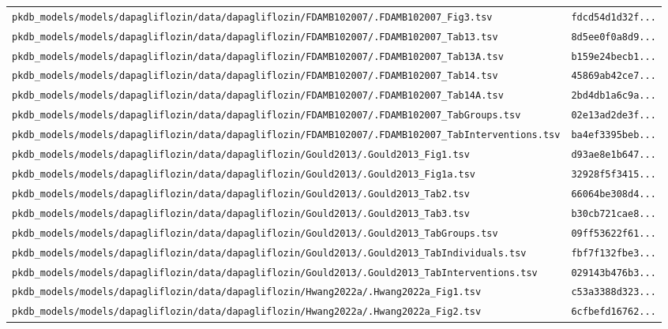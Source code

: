 \documentclass{article}
\begin{document}
\begin{longtable}{ll}
\texttt{pkdb\_models/models/dapagliflozin/data/dapagliflozin/FDAMB102007/.FDAMB102007\_Fig3.tsv} & \texttt{fdcd54d1d32f...} \\
\texttt{pkdb\_models/models/dapagliflozin/data/dapagliflozin/FDAMB102007/.FDAMB102007\_Tab13.tsv} & \texttt{8d5ee0f0a8d9...} \\
\texttt{pkdb\_models/models/dapagliflozin/data/dapagliflozin/FDAMB102007/.FDAMB102007\_Tab13A.tsv} & \texttt{b159e24becb1...} \\
\texttt{pkdb\_models/models/dapagliflozin/data/dapagliflozin/FDAMB102007/.FDAMB102007\_Tab14.tsv} & \texttt{45869ab42ce7...} \\
\texttt{pkdb\_models/models/dapagliflozin/data/dapagliflozin/FDAMB102007/.FDAMB102007\_Tab14A.tsv} & \texttt{2bd4db1a6c9a...} \\
\texttt{pkdb\_models/models/dapagliflozin/data/dapagliflozin/FDAMB102007/.FDAMB102007\_TabGroups.tsv} & \texttt{02e13ad2de3f...} \\
\texttt{pkdb\_models/models/dapagliflozin/data/dapagliflozin/FDAMB102007/.FDAMB102007\_TabInterventions.tsv} & \texttt{ba4ef3395beb...} \\
\texttt{pkdb\_models/models/dapagliflozin/data/dapagliflozin/Gould2013/.Gould2013\_Fig1.tsv} & \texttt{d93ae8e1b647...} \\
\texttt{pkdb\_models/models/dapagliflozin/data/dapagliflozin/Gould2013/.Gould2013\_Fig1a.tsv} & \texttt{32928f5f3415...} \\
\texttt{pkdb\_models/models/dapagliflozin/data/dapagliflozin/Gould2013/.Gould2013\_Tab2.tsv} & \texttt{66064be308d4...} \\
\texttt{pkdb\_models/models/dapagliflozin/data/dapagliflozin/Gould2013/.Gould2013\_Tab3.tsv} & \texttt{b30cb721cae8...} \\
\texttt{pkdb\_models/models/dapagliflozin/data/dapagliflozin/Gould2013/.Gould2013\_TabGroups.tsv} & \texttt{09ff53622f61...} \\
\texttt{pkdb\_models/models/dapagliflozin/data/dapagliflozin/Gould2013/.Gould2013\_TabIndividuals.tsv} & \texttt{fbf7f132fbe3...} \\
\texttt{pkdb\_models/models/dapagliflozin/data/dapagliflozin/Gould2013/.Gould2013\_TabInterventions.tsv} & \texttt{029143b476b3...} \\
\texttt{pkdb\_models/models/dapagliflozin/data/dapagliflozin/Hwang2022a/.Hwang2022a\_Fig1.tsv} & \texttt{c53a3388d323...} \\
\texttt{pkdb\_models/models/dapagliflozin/data/dapagliflozin/Hwang2022a/.Hwang2022a\_Fig2.tsv} & \texttt{6cfbefd16762...} \\

\end{longtable}
\end{document}
